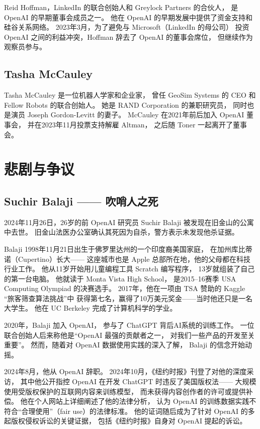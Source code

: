 Reid Hoffman，LinkedIn 的联合创始人和 Greylock Partners 的合伙人，
是 OpenAI 的早期董事会成员之一。
他在 OpenAI 的早期发展中提供了资金支持和硅谷关系网络。
2023年3月，为了避免与 Microsoft（LinkedIn 的母公司）
投资 OpenAI 之间的利益冲突，Hoffman 辞去了 OpenAI 的董事会席位，
但继续作为观察员参与。


\subsection{Tasha McCauley}
\label{subsec:tasha-mccauley}

Tasha McCauley 是一位机器人学家和企业家，
曾任 GeoSim Systems 的 CEO 和 Fellow Robots 的联合创始人。
她是 RAND Corporation 的兼职研究员，
同时也是演员 Joseph Gordon-Levitt 的妻子。
McCauley 在2021年前后加入 OpenAI 董事会，
并在2023年11月投票支持解雇 Altman，
之后随 Toner 一起离开了董事会。


\section{悲剧与争议}
\label{sec:openai-controversies}

\subsection{Suchir Balaji —— 吹哨人之死}
\label{subsec:suchir-balaji}

2024年11月26日，26岁的前 OpenAI 研究员 Suchir Balaji
被发现在旧金山的公寓中去世。
旧金山法医办公室确认其死因为自杀，警方表示未发现他杀证据。

Balaji 1998年11月21日出生于佛罗里达州的一个印度裔美国家庭，
在加州库比蒂诺（Cupertino）长大——
这座城市也是 Apple 总部所在地，他的父母都在科技行业工作。
他从11岁开始用儿童编程工具 Scratch 编写程序，
13岁就组装了自己的第一台电脑。
他就读于 Monta Vista High School，
是2015--16赛季 USA Computing Olympiad 的决赛选手。
2017年，他在一项由 TSA 赞助的 Kaggle ``旅客筛查算法挑战''中
获得第七名，赢得了10万美元奖金——当时他还只是一名大学生。
他在 UC Berkeley 完成了计算机科学的学业。

2020年，Balaji 加入 OpenAI，
参与了 ChatGPT 背后AI系统的训练工作。
一位联合创始人后来称他是``OpenAI 最强的贡献者之一，
对我们一些产品的开发至关重要''。
然而，随着对 OpenAI 数据使用实践的深入了解，
Balaji 的信念开始动摇。

2024年8月，他从 OpenAI 辞职。
2024年10月，《纽约时报》刊登了对他的深度采访，
其中他公开指控 OpenAI 在开发 ChatGPT 时违反了美国版权法——
大规模使用受版权保护的互联网内容来训练模型，
而未获得内容创作者的许可或提供补偿。
他在个人网站上详细阐述了他的法律分析，
认为 OpenAI 的训练数据实践不符合``合理使用''（fair use）的法律标准。
他的证词随后成为了针对 OpenAI 的多起版权侵权诉讼的关键证据，
包括《纽约时报》自身对 OpenAI 提起的诉讼。

